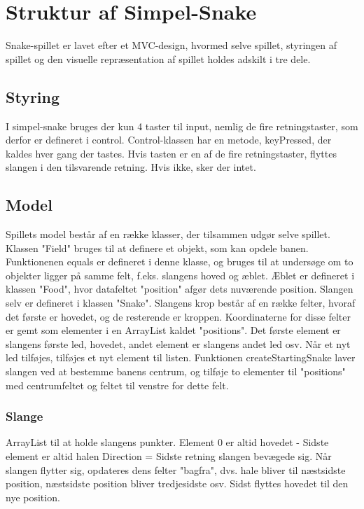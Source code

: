 \section{Struktur af Simpel-Snake}

Snake-spillet er lavet efter et MVC-design, hvormed selve spillet, styringen af spillet og den visuelle repræsentation af spillet holdes adskilt i tre dele.

\subsection{Styring}
I simpel-snake bruges der kun 4 taster til input, nemlig de fire retningstaster, som derfor er defineret i control. Control-klassen har en metode, keyPressed, der kaldes hver gang der tastes. Hvis tasten er en af de fire retningstaster, flyttes slangen i den tilsvarende retning. Hvis ikke, sker der intet.

\subsection{Model}
Spillets model består af en række klasser, der tilsammen udgør selve spillet.
Klassen "Field" bruges til at definere et objekt, som kan opdele banen. Funktionenen equals er defineret i denne klasse, og bruges til at undersøge om to objekter ligger på samme felt, f.eks. slangens hoved og æblet. Æblet er defineret i klassen "Food", hvor datafeltet "position" afgør dets nuværende position. 
Slangen selv er defineret i klassen "Snake". Slangens krop består af en række felter, hvoraf det første er hovedet, og de resterende er kroppen. Koordinaterne for disse felter er gemt som elementer i en ArrayList kaldet "positions". Det første element er slangens første led, hovedet, andet element er slangens andet led osv. Når et nyt led tilføjes, tilføjes et nyt element til listen. Funktionen createStartingSnake laver slangen ved at bestemme banens centrum, og tilføje to elementer til "positions" med centrumfeltet og feltet til venstre for dette felt.

\subsubsection{Slange}

	ArrayList til at holde slangens punkter.
	Element 0 er altid hovedet - Sidste element er altid halen
	Direction = Sidste retning slangen bevægede sig.
	Når slangen flytter sig, opdateres dens felter "bagfra", dvs. hale bliver til næstsidste 	position, næstsidste position bliver tredjesidste osv. Sidst flyttes hovedet til den nye 	position.
	
